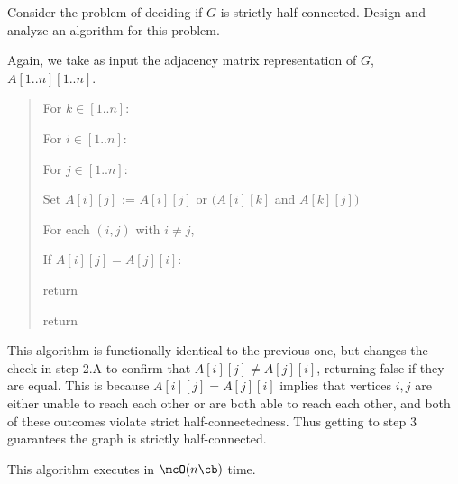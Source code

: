 \documentclass{article}
\begin{document}
\begin{subexercise}
  Consider the problem of deciding if $G$ is strictly half-connected.
  Design and analyze an algorithm for this problem.
\end{subexercise}

\begin{solution}
Again, we take as input the adjacency matrix representation of $ G $, $ A[1..n][1..n] $.
\begin{quote}
\begin{steps}
  \item For $ k\in [1..n] $: \begin{steps}
    \item For $ i\in [1..n] $: \begin{steps}
      \item For $ j\in [1..n] $: \begin{steps}
        \item Set $ A[i][j] $ := $ A[i][j] $ or $ (A[i][k] $ and $ A[k][j]) $
      \end{steps}
    \end{steps}
  \end{steps}
  \item For each $ (i,j) $ with $ i\neq j $, \begin{steps}
    \item If $ A[i][j] = A[j][i] $: \begin{steps}
      \item return \boolF
    \end{steps}
  \end{steps}
  \item return \boolT
\end{steps}
\end{quote}
This algorithm is functionally identical to the previous one, but changes the check in step 2.A to confirm that $ A[i][j] \neq A[j][i] $, returning false if they are equal.
This is because $ A[i][j] = A[j][i] $ implies that vertices $ i,j $ are either unable to reach each other or are both able to reach each other, and both of these outcomes violate strict half-connectedness.
Thus getting to step 3 guarantees the graph is strictly half-connected.

This algorithm executes in $ \mcO(n\cb) $ time.
\end{solution}
\pagebreak
\end{document}

